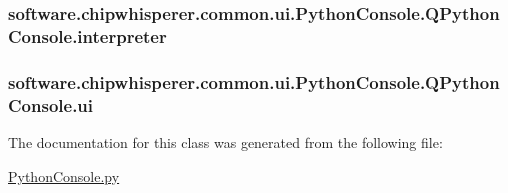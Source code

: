 \subsubsection[{interpreter}]{\setlength{\rightskip}{0pt plus 5cm}software.\+chipwhisperer.\+common.\+ui.\+Python\+Console.\+Q\+Python\+Console.\+interpreter}\label{classsoftware_1_1chipwhisperer_1_1common_1_1ui_1_1PythonConsole_1_1QPythonConsole_ab19e0f45f1ae712a330044f7d83f65e9}
\hypertarget{classsoftware_1_1chipwhisperer_1_1common_1_1ui_1_1PythonConsole_1_1QPythonConsole_a52233b537b052cef5b3bcfceb8d7b4f1}{}
\subsubsection[{ui}]{\setlength{\rightskip}{0pt plus 5cm}software.\+chipwhisperer.\+common.\+ui.\+Python\+Console.\+Q\+Python\+Console.\+ui}\label{classsoftware_1_1chipwhisperer_1_1common_1_1ui_1_1PythonConsole_1_1QPythonConsole_a52233b537b052cef5b3bcfceb8d7b4f1}


The documentation for this class was generated from the following file\+:\begin{DoxyCompactItemize}
\item 
\hyperlink{PythonConsole_8py}{Python\+Console.\+py}\end{DoxyCompactItemize}
